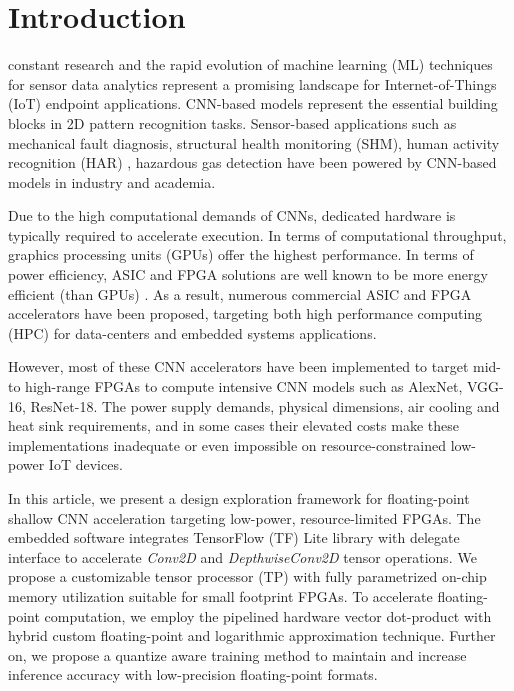 
\section{Introduction}
\label{sec:introduction}

 constant research and the rapid evolution of machine learning (ML) techniques for sensor data analytics represent a promising landscape for Internet-of-Things (IoT) endpoint applications. CNN-based models represent the essential building blocks in 2D pattern recognition tasks. Sensor-based applications such as mechanical fault diagnosis\cite{li2019sensor,dong2018rolling}, structural health monitoring (SHM)\cite{nagayama2007structural}, human activity recognition (HAR) \cite{wang2019deep}, hazardous gas detection\cite{kim2017hazardous} have been powered by CNN-based models in industry and academia.

Due to the high computational demands of CNNs, dedicated hardware is typically required to accelerate execution. In terms of computational throughput, graphics processing units (GPUs) offer the highest performance. In terms of power efficiency, ASIC and FPGA solutions are well known to be more energy efficient (than GPUs) \cite{nurvitadhi2017can}. As a result, numerous commercial ASIC and FPGA accelerators have been proposed, targeting both high performance computing (HPC) for data-centers and embedded systems applications.

However, most of these CNN accelerators have been implemented to target mid- to high-range FPGAs to compute intensive CNN models such as AlexNet, VGG-16, ResNet-18. The power supply demands, physical dimensions, air cooling and heat sink requirements, and in some cases their elevated costs make these implementations inadequate or even impossible on resource-constrained low-power IoT devices.

In this article, we present a design exploration framework for floating-point shallow CNN acceleration targeting low-power, resource-limited FPGAs. The embedded software integrates TensorFlow (TF) Lite library with delegate interface to accelerate \emph{Conv2D} and \emph{DepthwiseConv2D} tensor operations. We propose a customizable tensor processor (TP) with fully parametrized on-chip memory utilization suitable for small footprint FPGAs. To accelerate floating-point computation, we employ the pipelined hardware vector dot-product with hybrid custom floating-point and logarithmic approximation technique\cite{nevarez2021accelerating}. Further on, we propose a quantize aware training method to maintain and increase inference accuracy with low-precision floating-point formats.

